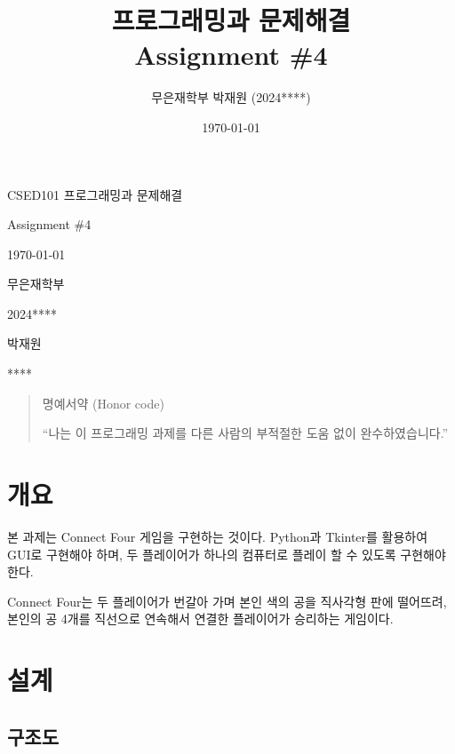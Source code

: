 \documentclass{article}
\title{프로그래밍과 문제해결 \\ Assignment \#4}
\author{무은재학부 박재원 (2024****)}
\date{\today}
\begin{document}
\begin{titlepage}
	\centering
	{\huge CSED101 프로그래밍과 문제해결\par}
	\vspace{0.5cm}
	{\LARGE Assignment \#4\par}
	\vspace{0.5cm}
	{\large \today\par}
	\vfill
  
  \begin{multicols}{2}
    \vphantom{}
    \columnbreak
  {
    \Large 
    \begin{description}[nosep, align=right, labelwidth=\widthof{00000000000000000}]
      \item[학과] 무은재학부
      \item[학번] 2024****
      \item[이름] 박재원
      \item[POVIS ID] ****
    \end{description}
  }
  \end{multicols}

  \vspace{1cm}


  \begin{quote}
    명예서약 (Honor code)

    ``나는 이 프로그래밍 과제를 다른 사람의 부적절한 도움 없이 완수하였습니다.''
  \end{quote}

\end{titlepage}

\tableofcontents

\section{개요}

본 과제는 Connect Four 게임을 구현하는 것이다. Python과 Tkinter를 활용하여 GUI로 구현해야 하며,
두 플레이어가 하나의 컴퓨터로 플레이 할 수 있도록 구현해야 한다. 

Connect Four는 두 플레이어가 번갈아 가며 본인 색의 공을 직사각형 판에 떨어뜨려,
본인의 공 4개를 직선으로 연속해서 연결한 플레이어가 승리하는 게임이다.

\section{설계}

\subsection{구조도}
\end{document}
